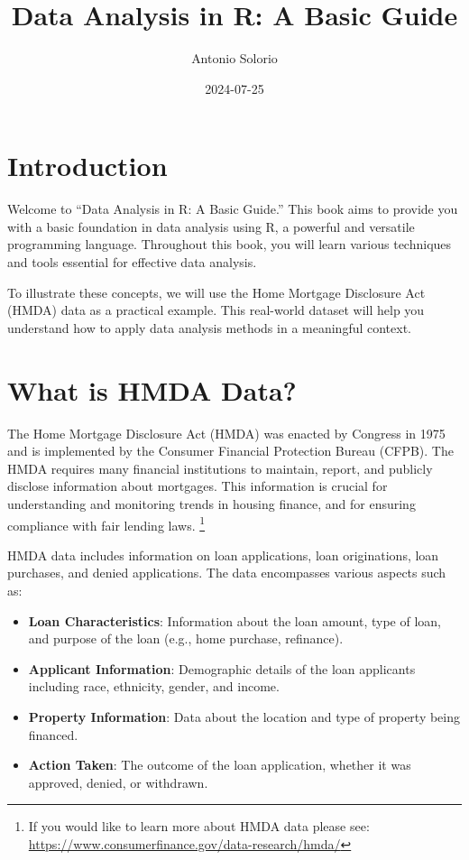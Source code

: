 \documentclass[
]{book}
\title{Data Analysis in R: A Basic Guide}
\author{Antonio Solorio}
\date{2024-07-25}
\providecommand{\tightlist}{%
  \setlength{\itemsep}{0pt}\setlength{\parskip}{0pt}}
\begin{document}
\maketitle

{
\setcounter{tocdepth}{1}
\tableofcontents
}
\hypertarget{introduction}{%
\chapter*{Introduction}\label{introduction}}

Welcome to ``Data Analysis in R: A Basic Guide.'' This book aims to provide you with a basic foundation in data analysis using R, a powerful and versatile programming language. Throughout this book, you will learn various techniques and tools essential for effective data analysis.

To illustrate these concepts, we will use the Home Mortgage Disclosure Act (HMDA) data as a practical example. This real-world dataset will help you understand how to apply data analysis methods in a meaningful context.

\hypertarget{what-is-hmda-data}{%
\chapter{What is HMDA Data?}\label{what-is-hmda-data}}

The Home Mortgage Disclosure Act (HMDA) was enacted by Congress in 1975 and is implemented by the Consumer Financial Protection Bureau (CFPB). The HMDA requires many financial institutions to maintain, report, and publicly disclose information about mortgages. This information is crucial for understanding and monitoring trends in housing finance, and for ensuring compliance with fair lending laws. \footnote{If you would like to learn more about HMDA data please see: \url{https://www.consumerfinance.gov/data-research/hmda/}}

HMDA data includes information on loan applications, loan originations, loan purchases, and denied applications. The data encompasses various aspects such as:

\begin{itemize}
\tightlist
\item
  \textbf{Loan Characteristics}: Information about the loan amount, type of loan, and purpose of the loan (e.g., home purchase, refinance).
\item
  \textbf{Applicant Information}: Demographic details of the loan applicants including race, ethnicity, gender, and income.
\item
  \textbf{Property Information}: Data about the location and type of property being financed.
\item
  \textbf{Action Taken}: The outcome of the loan application, whether it was approved, denied, or withdrawn.
\end{itemize}
\end{document}
